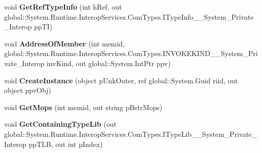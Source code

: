 \begin{DoxyCompactItemize}
void {\bfseries Get\+Ref\+Type\+Info} (int h\+Ref, out global\+::\+System.\+Runtime.\+Interop\+Services.\+Com\+Types.\+I\+Type\+Info\+\_\+\+\_\+\+System\+\_\+\+Private\+\_\+\+Interop pp\+TI)
\item 
\mbox{\label{interface_system_1_1_runtime_1_1_interop_services_1_1_com_types_1_1_i_type_info_____system___private___interop_ac1887de5b20a5e26671bbe3eea33a1e0}} 
void {\bfseries Address\+Of\+Member} (int memid, global\+::\+System.\+Runtime.\+Interop\+Services.\+Com\+Types.\+I\+N\+V\+O\+K\+E\+K\+I\+N\+D\+\_\+\+\_\+\+System\+\_\+\+Private\+\_\+\+Interop inv\+Kind, out global\+::\+System.\+Int\+Ptr ppv)
\item 
\mbox{\label{interface_system_1_1_runtime_1_1_interop_services_1_1_com_types_1_1_i_type_info_____system___private___interop_a3761e8c27250fe83496741af259e32b2}} 
void {\bfseries Create\+Instance} (object p\+Unk\+Outer, ref global\+::\+System.\+Guid riid, out object ppv\+Obj)
\item 
\mbox{\label{interface_system_1_1_runtime_1_1_interop_services_1_1_com_types_1_1_i_type_info_____system___private___interop_ad7930f0f8850b675844658850a360028}} 
void {\bfseries Get\+Mops} (int memid, out string p\+Bstr\+Mops)
\item 
\mbox{\label{interface_system_1_1_runtime_1_1_interop_services_1_1_com_types_1_1_i_type_info_____system___private___interop_acc525f75f6bdf2ae3ff9bd1d132e010e}} 
void {\bfseries Get\+Containing\+Type\+Lib} (out global\+::\+System.\+Runtime.\+Interop\+Services.\+Com\+Types.\+I\+Type\+Lib\+\_\+\+\_\+\+System\+\_\+\+Private\+\_\+\+Interop pp\+T\+LB, out int p\+Index)
\item 
\mbox{\label{interface_system_1_1_runtime_1_1_interop_services_1_1_com_types_1_1_i_type_info_____system___private___interop_a455eccf7a3747e78838d503b18d828a5}} 

\end{DoxyCompactItemize}

